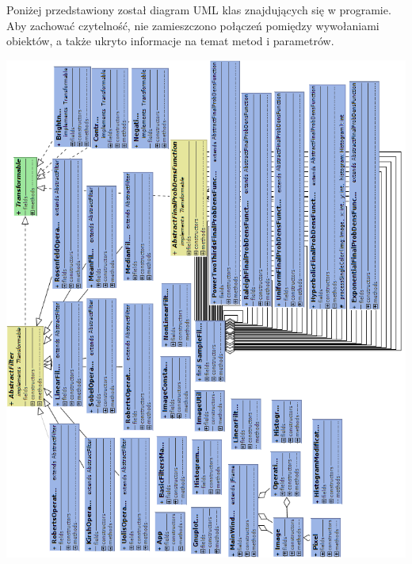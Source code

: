\documentclass{classrep}
\begin{document}
Poniżej przedstawiony został diagram UML klas znajdujących się w programie. Aby zachować czytelność, nie zamieszczono połączeń pomiędzy wywołaniami obiektów, a także ukryto informacje na temat metod i parametrów.

\includegraphics[scale=0.6]{img/uml_diagram.png}
\end{document}
